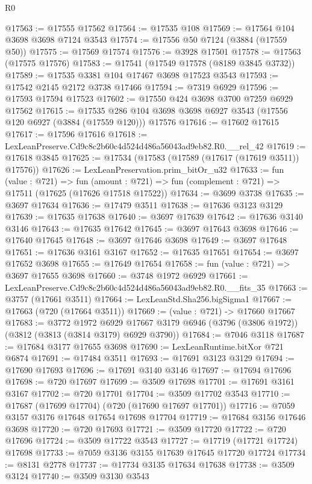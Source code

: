 \begin{lexlean}{R0}
\begin{coremodule}
@17563 := @17555 @17562
@17564 := @17535 @108
@17569 := @17564 @104 @3698 @3698 @7124 @3543
@17574 := @17556 @50 @7124 (@3884 (@17559 @50))
@17575 := @17569 @17574
@17576 := @3928 @17501
@17578 := @17563 (@17575 @17576)
@17583 := @17541 (@17549 @17578 (@8189 @3845 @3732))
@17589 := @17535 @3381 @104 @17467 @3698 @17523 @3543
@17593 := @17542 @2145 @2172 @3738 @17466
@17594 := @7319 @6929
@17596 := @17593 @17594 @17523
@17602 := @17550 @424 @3698 @3700 @7259 @6929 @17562
@17615 := @17535 @286 @104 @3698 @3698 @6927 @3543 (@17556 @120 @6927 (@3884 (@17559 @120))) @17576
@17616 := @17602 @17615
@17617 := @17596 @17616
@17618 := LexLeanPreserve.Cd9c8c2b60c4d524d486a56043ad9eb82.R0.__rel_42
@17619 := @17618 @3845
@17625 := @17534 (@17583 (@17589 (@17617 (@17619 @3511)) @17576))
@17626 := LexLeanPreservation.prim_bitOr_u32
@17633 := fun (value : @721) =>
  fun (amount : @721) => fun (complement : @721) => @17511 (@17625 (@17626 @17518 @17522))
@17634 := @3699 @3738
@17635 := @3697 @17634
@17636 := @17479 @3511
@17638 := @17636 @3123 @3129
@17639 := @17635 @17638
@17640 := @3697 @17639
@17642 := @17636 @3140 @3146
@17643 := @17635 @17642
@17645 := @3697 @17643 @3698
@17646 := @17640 @17645
@17648 := @3697 @17646 @3698
@17649 := @3697 @17648
@17651 := @17636 @3161 @3167
@17652 := @17635 @17651
@17654 := @3697 @17652 @3698
@17655 := @17649 @17654
@17658 := fun (value : @721) => @3697 @17655 @3698
@17660 := @3748 @1972 @6929
@17661 := LexLeanPreserve.Cd9c8c2b60c4d524d486a56043ad9eb82.R0.__fits_35
@17663 := @3757 (@17661 @3511)
@17664 := LexLeanStd.Sha256.bigSigma1
@17667 := @17663 (@720 (@17664 @3511))
@17669 := (value : @721) -> @17660 @17667
@17683 := @3772
    @1972
    @6929
    @17667
    @3179
    @6946
    (@3796 (@3806 @1972))
    (@3812 (@3813 (@3814 @3179) @6929 @3790))
@17684 := @7046 @3118
@17687 := @17684 @3177 @17655 @3698
@17690 := LexLeanRuntime.bitXor @721 @6874
@17691 := @17484 @3511
@17693 := @17691 @3123 @3129
@17694 := @17690 @17693
@17696 := @17691 @3140 @3146
@17697 := @17694 @17696
@17698 := @720 @17697
@17699 := @3509 @17698
@17701 := @17691 @3161 @3167
@17702 := @720 @17701
@17704 := @3509 @17702 @3543
@17710 := @17687 (@17699 @17704) (@720 (@17690 @17697 @17701))
@17716 := @7059 @3157 @3176 @17648 @17654 @17698 @17704
@17719 := @17684 @3156 @17646 @3698
@17720 := @720 @17693
@17721 := @3509 @17720
@17722 := @720 @17696
@17724 := @3509 @17722 @3543
@17727 := @17719 (@17721 @17724) @17698
@17733 := @7059 @3136 @3155 @17639 @17645 @17720 @17724
@17734 := @8131 @2778
@17737 := @17734 @3135 @17634 @17638
@17738 := @3509 @3124
@17740 := @3509 @3130 @3543

\end{coremodule}
\end{lexlean}
